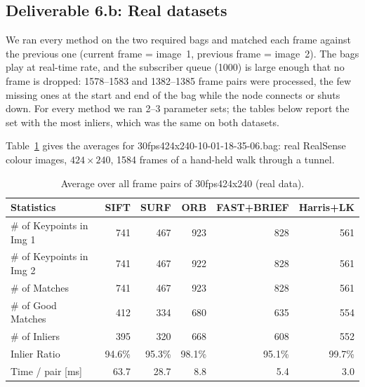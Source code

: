 \documentclass[11pt,a4paper]{article}
\newenvironment{keep}{\par\begin{lrbox}{\keepbox}\begin{minipage}{\linewidth}\setlength{\parskip}{0.4em}}{\end{minipage}\end{lrbox}%
  \noindent\usebox{\keepbox}\par}
\DeclareRobustCommand{\code}[1]{\begingroup\ttfamily\codebreaks#1\endgroup}
\newcommand{\codebreaks}{\renewcommand{\_}{\textunderscore\allowbreak}}
\begin{document}
\subsection{Deliverable 6.b: Real datasets}

We ran every method on the two required bags and matched each frame against the previous
one (current frame = image~1, previous frame = image~2). The bags play at real-time rate,
and the subscriber queue (1000) is large enough that no frame is dropped: 1578--1583 and
1382--1385 frame pairs were processed, the few missing ones at the start and end of the bag
while the node connects or shuts down. For every method we ran 2--3 parameter sets; the
tables below report the set with the most inliers, which was the same on both datasets.

\begin{keep}
Table~\ref{tab:30fps} gives the averages for \code{30fps\_424x240\_2018-10-01-18-35-06.bag}:
real RealSense colour images, $424\times240$, 1584 frames of a hand-held walk through a
tunnel.

\begin{table}[H]
  \centering\small
  \caption{Average over all frame pairs of \code{30fps\_424x240} (real data).}
  \label{tab:30fps}
  \begin{tabular}{lrrrrr}
    \toprule
    Statistics & SIFT & SURF & ORB & FAST+BRIEF & Harris+LK \\
    \midrule
\# of Keypoints in Img 1 & 741 & 467 & 923 & 828 & 561 \\
\# of Keypoints in Img 2 & 741 & 467 & 922 & 828 & 561 \\
\# of Matches & 741 & 467 & 923 & 828 & 561 \\
\# of Good Matches & 412 & 334 & 680 & 635 & 554 \\
\# of Inliers & 395 & 320 & 668 & 608 & 552 \\
Inlier Ratio & 94.6\% & 95.3\% & 98.1\% & 95.1\% & 99.7\% \\
Time / pair [ms] & 63.7 & 28.7 & 8.8 & 5.4 & 3.0 \\
    \bottomrule
  \end{tabular}
\end{table}
\end{keep}
\end{document}

